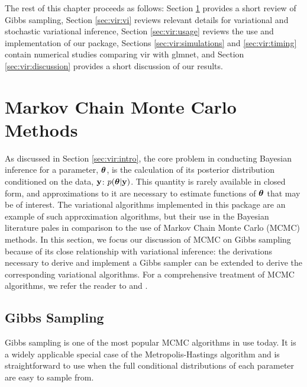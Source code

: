 \documentclass[]{article}
\newcommand{\V}[1]{{\bm{\mathbf{\MakeLowercase{#1}}}}} %
\def\y{{\bf y}}
\def \vtheta{{\V{\theta}}}
\newcommand{\pkg}[1]{{\fontseries{b}\selectfont #1}}
\begin{document}
The rest of this chapter proceeds as follows: Section \ref{sec:vir:mcmc}
provides a short review of Gibbs sampling, Section \ref{sec:vir:vi} reviews
relevant details for variational and stochastic variational inference, Section
\ref{sec:vir:usage} reviews the use and implementation of our package, Sections
\ref{sec:vir:simulations} and \ref{sec:vir:timing} contain numerical studies
comparing \pkg{vir} with \pkg{glmnet}, and Section \ref{sec:vir:discussion}
provides a short discussion of our results. 

\section{Markov Chain Monte Carlo Methods} \label{sec:vir:mcmc}

As discussed in Section \ref{sec:vir:intro},  the core problem in conducting
Bayesian inference for a parameter, $\vtheta$, is the calculation of its
posterior distribution conditioned on the data, $\y$: $p(\vtheta | \y)$.  This
quantity is rarely available in closed form, and approximations to it are
necessary to estimate functions of $\vtheta$ that may be of interest.  The
variational algorithms implemented in this package are an example of such
approximation algorithms, but their use in the Bayesian literature pales in
comparison to the use of Markov Chain Monte Carlo (MCMC) methods. In this
section, we focus our discussion of MCMC on Gibbs sampling because of its close
relationship with variational inference: the derivations necessary to derive and
implement a Gibbs sampler can be extended to derive the corresponding
variational algorithms. For a comprehensive treatment of MCMC algorithms, we
refer the reader to \citet{robert2013monte} and \citet{brooks2011handbook}.

\subsection{Gibbs Sampling}

Gibbs sampling is one of the most popular MCMC algorithms in use today. It is a
widely applicable special case of the Metropolis-Hastings algorithm and is
straightforward to use when the full conditional distributions of each parameter
are easy to sample from.
\end{document}
